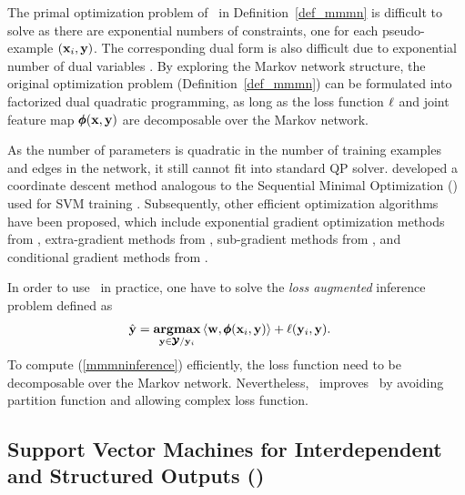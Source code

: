 {The primal optimization problem of \mmmn\ in Definition~\ref{def_mmmn} is difficult to solve as there are exponential numbers of constraints, one for each pseudo-example $(\mathbf {x}_i,\mathbf {y})$.
The corresponding dual form is also difficult due to exponential number of dual variables \citep{Taskar04max}.
By exploring the Markov network structure, the original optimization problem (Definition~\ref{def_mmmn}) can be formulated into factorized dual quadratic programming, as long as the loss function $\mathbf {\ell}$ and joint feature map $\pmb \phi(\mathbf {x},\mathbf {y})$ are decomposable over the Markov network.

As the number of parameters is quadratic in the number of training examples and edges in the network, it still cannot fit into standard QP solver. 
\citep{Taskar04max} developed a coordinate descent method analogous to the Sequential Minimal Optimization (\smo) used for SVM training \citep{Platt98sequential,Platt99fast}.
Subsequently, other efficient optimization algorithms have been proposed, which include exponential gradient optimization methods from \citet{bartlett04}, extra-gradient methods from \citet{taskar06}, sub-gradient methods from \citet{Ratliff07}, and conditional gradient methods from \citet{rousu06, rousu07}.

In order to use \mmmn\ in practice, one have to solve the \textit{loss augmented} inference problem defined as
\begin{align}
	\hat{\mathbf {y}} = \underset{\mathbf {y}\in\pmb {\mathcal{Y}}/\mathbf {y}_i}{\textbf{argmax}} &\, \langle \mathbf {w}, \pmb \phi(\mathbf {x}_i,\mathbf {y}) \rangle + \mathbf {\ell}(\mathbf {y}_i,\mathbf {y}) \label{mmmninference}.
\end{align} 
To compute (\ref{mmmninference}) efficiently, the loss function need to be decomposable over the Markov network.
Nevertheless, \mmmn\ improves \crf\ by avoiding partition function and allowing complex loss function.


%
% 
\subsection{Support Vector Machines for Interdependent and Structured Outputs (\svmstruct)} \label{sc_svmstruct}

}
